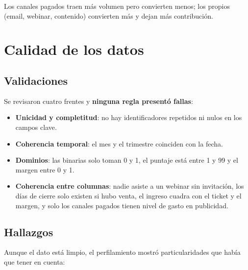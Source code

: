 \documentclass[11pt,letterpaper]{article}
\begin{document}
Los canales pagados traen más volumen pero convierten menos; los propios (email, webinar, contenido) convierten
más y dejan más contribución.

\section{Calidad de los datos}

\subsection{Validaciones}

Se revisaron cuatro frentes y \textbf{ninguna regla presentó fallas}:

\begin{itemize}
  \item \textbf{Unicidad y completitud}: no hay identificadores repetidos ni nulos en los campos clave.
  \item \textbf{Coherencia temporal}: el mes y el trimestre coinciden con la fecha.
  \item \textbf{Dominios}: las binarias solo toman 0 y 1, el puntaje está entre 1 y 99 y el margen entre 0 y 1.
  \item \textbf{Coherencia entre columnas}: nadie asiste a un webinar sin invitación, los días de cierre solo
        existen si hubo venta, el ingreso cuadra con el ticket y el margen, y solo los canales pagados tienen
        nivel de gasto en publicidad.
\end{itemize}

\subsection{Hallazgos}

Aunque el dato está limpio, el perfilamiento mostró particularidades que había que tener en cuenta:
\end{document}
